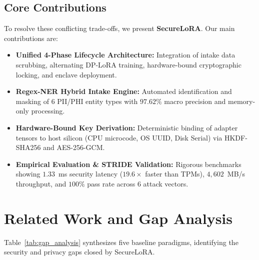 \documentclass[10pt,conference,compsocconf]{IEEEtran}
\begin{document}
\subsection{Core Contributions}
To resolve these conflicting trade-offs, we present \textbf{SecureLoRA}. Our main contributions are:
\begin{itemize}
    \item \textbf{Unified 4-Phase Lifecycle Architecture:} Integration of intake data scrubbing, alternating DP-LoRA training, hardware-bound cryptographic locking, and enclave deployment.
    \item \textbf{Regex-NER Hybrid Intake Engine:} Automated identification and masking of 6 PII/PHI entity types with $97.62\%$ macro precision and memory-only processing.
    \item \textbf{Hardware-Bound Key Derivation:} Deterministic binding of adapter tensors to host silicon (CPU microcode, OS UUID, Disk Serial) via HKDF-SHA256 and AES-256-GCM.
    \item \textbf{Empirical Evaluation \& STRIDE Validation:} Rigorous benchmarks showing $1.33$~ms security latency ($19.6\times$ faster than TPMs), $4,602$~MB/s throughput, and $100\%$ pass rate across 6 attack vectors.
\end{itemize}

\section{Related Work and Gap Analysis}
\label{sec:related}

Table~\ref{tab:gap_analysis} synthesizes five baseline paradigms, identifying the security and privacy gaps closed by SecureLoRA.
\end{document}
